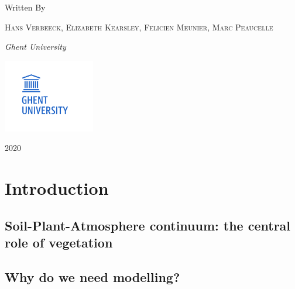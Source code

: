\documentclass[
  oneside]{book}
\begin{document}
\begin{titlepage}
	Written By
	
	\vspace{0.5\baselineskip} %
	
	{\scshape Hans Verbeeck, Elizabeth Kearsley, Felicien Meunier, Marc Peaucelle \\} %
	
	\vspace{0.5\baselineskip} %
	
	\textit{Ghent University \\} %
	
	\vfill %
	
	
	
	\includegraphics[width=40mm]{figures/UGhent.png}
	
	\vspace{0.3\baselineskip} %
	
	2020 %
	

\end{titlepage}

{
\setcounter{tocdepth}{1}
\tableofcontents
}
\mainmatter

\hypertarget{intro}{%
\chapter{Introduction}\label{intro}}

\hypertarget{soil-plant-atmosphere-continuum-the-central-role-of-vegetation}{%
\section{Soil-Plant-Atmosphere continuum: the central role of vegetation}\label{soil-plant-atmosphere-continuum-the-central-role-of-vegetation}}

\hypertarget{why-do-we-need-modelling}{%
\section{Why do we need modelling?}\label{why-do-we-need-modelling}}
\end{document}
